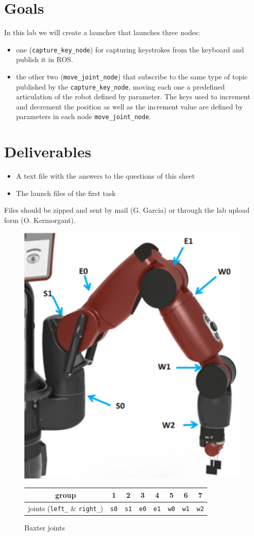 \documentclass{ecnreport}
\author{G. Garcia, O. Kermorgant}
\begin{document}


\section{Goals}

In this lab we will create a launcher that launches three nodes:

\begin{itemize}
 \item one (\texttt{capture\_key\_node}) for capturing keystrokes  from the keyboard and publish it in ROS.
\item  the other two (\texttt{move\_joint\_node}) that subscribe to the same type of topic published by the \texttt{capture\_key\_node},
moving each one a predefined articulation of the robot defined by parameter.
The keys used to increment and decrement the position as well as the increment value are defined by parameters  in each node \texttt{move\_joint\_node}.
\end{itemize}

\section{Deliverables}

\begin{itemize}
 \item A text file with the answers to the questions of this sheet
 \item The launch files of the first task
\end{itemize}
Files should be zipped and sent by mail (G. Garcia) or through the lab upload form (O. Kermorgant).

\begin{figure}[h]\centering
 \includegraphics[width=.3\linewidth]{baxter} \\
  \begin{tabular}{|c|c|c|c|c|c|c|c|}
  \hline
  group & 1 & 2 & 3 & 4 & 5 & 6 & 7 \\\hline
  joints (\texttt{left\_} \& \texttt{right\_})& \texttt{s0} & \texttt{s1}& \texttt{e0} & \texttt{e1} & \texttt{w0} & \texttt{w1} & \texttt{w2} \\\hline
 \end{tabular}
 \caption{Baxter joints}
 \label{baxter}
\end{figure}
\end{document}
